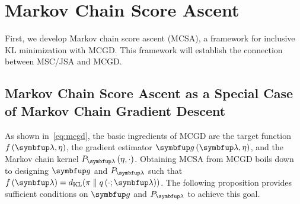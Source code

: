 
\vspace{-0.07in}
\section{Markov Chain Score Ascent}\label{section:mcsa}
\vspace{-0.08in}

First, we develop Markov chain score ascent (MCSA), a framework for inclusive KL minimization with MCGD.
This framework will establish the connection between MSC/JSA and MCGD.

\vspace{-0.08in}
\subsection{Markov Chain Score Ascent as a Special Case of Markov Chain Gradient Descent}\label{section:convergence}
\vspace{-0.07in}
As shown in~\cref{eq:mcgd}, the basic ingredients of MCGD are the target function \(f\left(\vlambda, \eta\right)\), the gradient estimator \(\vg\left(\vlambda, \eta\right)\), and the Markov chain kernel \(P_{\vlambda}\left(\eta, \cdot\right)\).
Obtaining MCSA from MCGD boils down to designing \(\vg\) and \(P_{\vlambda}\) such that \(f\left(\vlambda\right) = \DKL{\pi}{q\left(\cdot; \vlambda\right)} \).
The following proposition provides sufficient conditions on \(\vg\) and \(P_{\vlambda}\) to achieve this goal.


